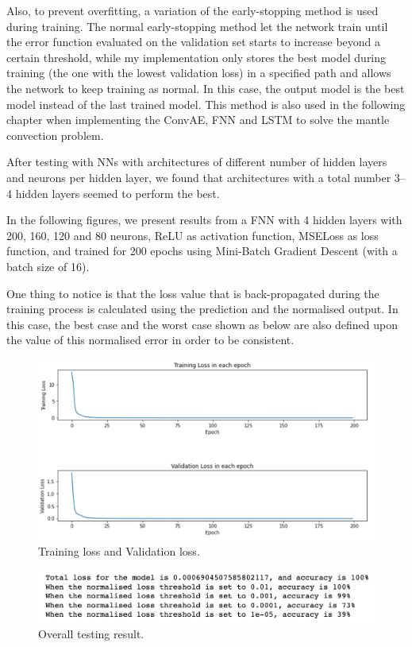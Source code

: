 Also, to prevent overfitting, a variation of the early-stopping method is used during training. The normal early-stopping method let the network train until the error function evaluated on the validation set starts to increase beyond a certain threshold\citep{10.1007_978-3-642-35289-8_5}, while my implementation only stores the best model during training (the one with the lowest validation loss) in a specified path and allows the network to keep training as normal. In this case, the output model is the best model instead of the last trained model. This method is also used in the following chapter when implementing the ConvAE, FNN and LSTM to solve the mantle convection problem.

After testing with NNs with architectures of different number of hidden layers and neurons per hidden layer, we found that architectures with a total number 3–4 hidden layers seemed to perform the best.

In the following figures, we present results from a FNN with 4 hidden layers with 200, 160, 120 and 80 neurons, ReLU as activation function, MSELoss as loss function, and trained for 200 epochs using Mini-Batch Gradient Descent (with a batch size of 16).

One thing to notice is that the loss value that is back-propagated during the training process is calculated using the prediction and the normalised output. In this case, the best case and the worst case shown as below are also defined upon the value of this normalised error in order to be consistent.

\begin{figure}[H]
    \caption{Training loss and Validation loss.}
    \includegraphics[scale=0.6]{figures/geoid_images/Geoid_trainingData.png}
\end{figure}

\begin{figure}[H]
    \caption{Overall testing result.}
    \includegraphics[scale=0.8]{figures/geoid_images/Geoid_OverallTesting.png}
\end{figure}

